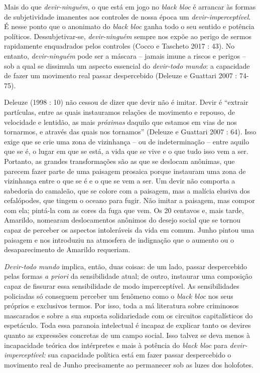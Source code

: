 Mais do que \emph{devir-ninguém}, o que está em jogo no \emph{black bloc
}é arrancar às formas de subjetividade imanentes aos controles de nossa
época um \emph{devir-imperceptível}. É nesse ponto que o anonimato do
\emph{black bloc} ganha todo o seu sentido e potência políticos.
Dessubjetivar-se, \emph{devir-ninguém} sempre nos expõe ao perigo de
sermos rapidamente enquadrados pelos controles (Cocco e Tascheto 2017 :
43). No entanto, \emph{devir-ninguém} pode ser a máscara -- jamais imune
a riscos e perigos -- sob a qual se dissimula um aspecto essencial do
\emph{devir-todo mundo}: a capacidade de fazer um movimento real passar
despercebido (Deleuze e Guattari 2007 : 74-75).

Deleuze (1998 : 10) não cessou de dizer que devir não é imitar. Devir é
``extrair partículas, entre as quais instauramos relações de movimento e
repouso, de velocidade e lentidão, as mais\emph{ próximas }daquilo que
estamos em vias de nos tornarmos, e através das quais nos tornamos''
(Deleuze e Guattari 2007 : 64). Isso exige que se crie uma zona de
vizinhança -- ou de indeterminação -- entre aquilo que se é, o lugar em
que se está, a vida que se vive e o que tudo isso vem a ser. Portanto,
as grandes transformações são as que se deslocam anônimas, que parecem
fazer parte de uma paisagem prosaica porque instauram uma zona de
vizinhança entre o que se é e o que se vem a ser. Um devir não comporta
a sabedoria do camaleão, que se colore com a paisagem, mas a malícia
elusiva dos cefalópodes, que tingem o oceano para fugir. Não imitar a
paisagem, mas compor com ela; pintá-la com as cores da fuga que vem. Os
20 centavos e, mais tarde, Amarildo, nomearam deslocamentos anônimos do
desejo social que se tornou capaz de perceber os aspectos intoleráveis
da vida em comum. Junho pintou uma paisagem e nos introduziu na
atmosfera de indignação que o aumento ou o desaparecimento de Amarildo
requeriam.

\emph{Devir-todo mundo }implica, então, duas coisas: de um lado, passar
despercebido pelas formas \emph{a priori }da sensibilidade atual; de
outro, instaurar uma composição capaz de fissurar essa sensibilidade de
modo imperceptível. As sensibilidades policiadas só conseguem perceber
um fenômeno como o \emph{black bloc} nos seus próprios e exclusivos
termos. Por isso, toda a má literatura sobre criminosos mascarados e
sobre a sua suposta solidariedade com os circuitos capitalísticos do
espetáculo. Toda essa paranoia intelectual é incapaz de explicar tanto
os devires quanto as expressões concretas de um campo social. Isso
talvez se deva menos à incapacidade teórica dos intérpretes e mais à
potência do \emph{black bloc }para \emph{devir-imperceptível:} sua
capacidade política está em fazer passar despercebido o movimento real
de Junho precisamente ao permanecer sob as luzes dos holofotes.

